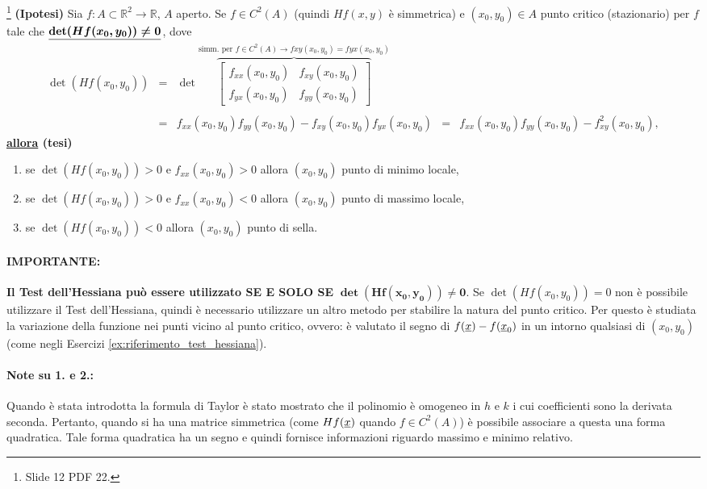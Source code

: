 \begin{definition}\label{def:test_hessiana}\footnote{Slide 12 PDF 22.}
	\textbf{(Ipotesi)} Sia $f:A\subset \mathbb{R}^2\rightarrow\mathbb{R}$, $A$ aperto. Se $f\in C^2(A)$ (quindi $Hf(x,y)$ è simmetrica) e $(x_0,y_0)\in A$ punto critico (stazionario) per $f$ tale che $\boldsymbol{\uline{\det(Hf(x_0,y_0))\neq 0}}$, dove
	\begin{equation*}
		\begin{matrix}
			\det(Hf(x_0,y_0)) &=&
			\det\overbrace{\begin{bmatrix}
				f_{xx}(x_0,y_0) & f_{xy}(x_0,y_0) \\
				f_{yx}(x_0,y_0) &  f_{yy}(x_0,y_0) 
			\end{bmatrix}}^{\text{simm. per } f\in C^2(A)\rightarrow fxy(x_0,y_0)=fyx(x_0,y_0)} \\\\&=& f_{xx}(x_0,y_0)f_{yy}(x_0,y_0) - f_{xy}(x_0,y_0) f_{yx} (x_0,y_0) &=& f_{xx}(x_0,y_0)f_{yy}(x_0,y_0) - f_{xy}^2(x_0,y_0),
		\end{matrix}
	\end{equation*}
	\textbf{\ul{allora} (tesi)}
	\begin{enumerate}
		\item se $\det(Hf(x_0,y_0))>0$ e $f_{xx}(x_0,y_0)>0$ allora $(x_0,y_0)$ punto di minimo locale,
		\item se $\det(Hf(x_0,y_0))>0$ e $f_{xx}(x_0,y_0)<0$ allora $(x_0,y_0)$ punto di massimo locale,
		\item se $\det(Hf(x_0,y_0))<0$ allora $(x_0,y_0)$ punto di sella.
	\end{enumerate}
\end{definition}

\paragraph{IMPORTANTE:} \textbf{Il Test dell'Hessiana può essere utilizzato SE E SOLO SE} $\boldsymbol{\det(Hf(x_0,y_0))\neq 0}$. Se $\det (Hf(x_0,y_0)) = 0$ non è possibile utilizzare il Test dell'Hessiana, quindi è necessario utilizzare un altro metodo per stabilire la natura del punto critico. Per questo è studiata la variazione della funzione nei punti vicino al punto critico, ovvero: è valutato il segno di $f(\uline x) - f(\uline x_0)$ in un intorno qualsiasi di $(x_0,y_0)$ (come negli Esercizi \ref{ex:riferimento_test_hessiana}).

\paragraph{Note su 1. e 2.:} Quando è stata introdotta la formula di Taylor è stato mostrato che il polinomio è omogeneo in $h$ e $k$ i cui coefficienti sono la derivata seconda. Pertanto, quando si ha una matrice simmetrica (come $Hf(\uline x)$ quando $f\in C^2(A)$) è possibile associare a questa una forma quadratica. Tale forma quadratica ha un segno e quindi fornisce informazioni riguardo massimo e minimo relativo.

